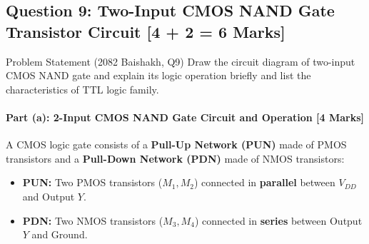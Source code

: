 \documentclass[11pt,a4paper,oneside]{book}
\begin{document}
\vspace{0.6cm}

\subsection{Question 9: Two-Input CMOS NAND Gate Transistor Circuit [4 + 2 = 6 Marks]}
\begin{questionbox}{Problem Statement (2082 Baishakh, Q9)}
Draw the circuit diagram of two-input CMOS NAND gate and explain its logic operation briefly and list the characteristics of TTL logic family.
\end{questionbox}

\paragraph{Part (a): 2-Input CMOS NAND Gate Circuit and Operation [4 Marks]}
A CMOS logic gate consists of a \textbf{Pull-Up Network (PUN)} made of PMOS transistors and a \textbf{Pull-Down Network (PDN)} made of NMOS transistors:
\begin{itemize}
  \item \textbf{PUN:} Two PMOS transistors ($M_1, M_2$) connected in \textbf{parallel} between $V_{DD}$ and Output $Y$.
  \item \textbf{PDN:} Two NMOS transistors ($M_3, M_4$) connected in \textbf{series} between Output $Y$ and Ground.
\end{itemize}
\end{document}

